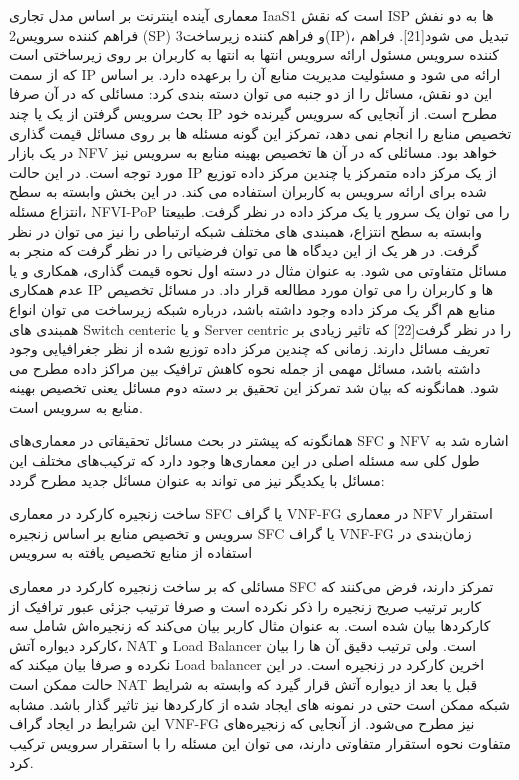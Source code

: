 معماری آینده اینترنت بر اساس مدل تجاری IaaS1 است که نقش ISP ها به دو نفش فراهم کننده سرویس2 (SP) و فراهم کننده زیرساخت3(IP)، تبدیل می شود[21]. فراهم کننده سرویس مسئول ارائه سرویس انتها به انتها به کاربران بر روی زیرساختی است که از سمت IP ارائه می شود و مسئولیت مدیریت منابع آن را برعهده دارد. بر اساس این دو نقش، مسائل را از دو جنبه می توان دسته بندی کرد:
 مسائلی که در آن صرفا بحث سرویس گرفتن از یک یا چند IP مطرح است. از آنجایی که سرویس گیرنده خود تخصیص منابع را انجام نمی دهد، تمرکز این گونه مسئله ها بر روی مسائل قیمت گذاری در یک بازار NFV خواهد بود.
 مسائلی که در آن ها تخصیص بهینه منابع به سرویس نیز مورد توجه است. در این حالت IP از یک مرکز داده متمرکز یا چندین مرکز داده توزیع شده برای ارائه سرویس به کاربران استفاده می کند.  در این بخش وابسته به سطح  انتزاع مسئله، NFVI-PoP را می توان یک سرور یا یک مرکز داده در نظر گرفت. طبیعتا وابسته به سطح انتزاع، همبندی های مختلف شبکه ارتباطی را نیز می توان در نظر گرفت.
در هر یک از این دیدگاه ها می توان فرضیاتی را در نظر گرفت که منجر به مسائل متفاوتی می شود. به عنوان مثال در دسته اول نحوه قیمت گذاری، همکاری و یا عدم همکاری IP ها و کاربران را می توان مورد مطالعه قرار داد. در مسائل تخصیص منابع هم اگر یک مرکز داده وجود داشته باشد، درباره شبکه زیرساخت می توان انواع همبندی های Switch centeric و یا Server centric را در نظر گرفت[22] که تاثیر زیادی بر تعریف مسائل دارند. زمانی که چندین مرکز داده توزیع شده از نظر جغرافیایی وجود داشته باشد، مسائل مهمی از جمله نحوه کاهش ترافیک بین مراکز داده مطرح می شود. همانگونه که بیان شد تمرکز این تحقیق بر دسته دوم مسائل یعنی تخصیص بهینه منابع به سرویس است.



همانگونه که پیشتر در بحث مسائل تحقیقاتی در معماری‌های SFC و NFV اشاره شد به طول کلی سه مسئله اصلی در این معماری‌ها وجود دارد که ترکیب‌های مختلف این مسائل با یکدیگر نیز می تواند به عنوان مسائل جدید مطرح گردد:

 ساخت زنجیره کارکرد در معماری SFC یا گراف VNF-FG در معماری NFV
 استقرار سرویس و تخصیص منابع بر اساس زنجیره SFC یا گراف VNF-FG
 زمان‌بندی در استفاده از منابع تخصیص یافته به سرویس

مسائلی که بر ساخت زنجیره کارکرد در معماری SFC تمرکز دارند، فرض می‌کنند که کاربر ترتیب صریح زنجیره را ذکر نکرده است و صرفا ترتیب جزئی عبور ترافیک از کارکردها بیان شده است.
به عنوان مثال کاربر بیان می‌کند که زنجیره‌اش شامل سه کارکرد دیواره آتش، NAT و Load Balancer است. ولی ترتیب دقیق آن ها را بیان نکرده و صرفا بیان میکند که Load balancer اخرین کارکرد در زنجیره است.
در این حالت ممکن است NAT قبل یا بعد از دیواره آتش قرار گیرد که وابسته به شرایط شبکه ممکن است حتی در نمونه های ایجاد شده از کارکردها نیز تاثیر گذار باشد.
مشابه این شرایط در ایجاد گراف VNF-FG نیز مطرح می‌شود. از آنجایی که زنجیره‌های متفاوت نحوه استقرار متفاوتی دارند، می توان این مسئله را با استقرار سرویس ترکیب کرد.

